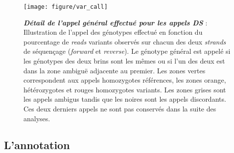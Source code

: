 \documentclass[12pt,a4paper,twoside]{ugathesis}
\theoremstyle{definition}
\theoremstyle{definition}
\theoremstyle{definition}
\theoremstyle{remark}
\begin{document}
\begin{figure}

{\centering \texttt{[image: figure/var\_call]} 

}

\caption[Détail de l'appel général effectué pour les appels DS]{\textbf{\emph{Détail de l'appel général effectué pour
les appels DS}} : Illustration de l'appel des génotypes effectué en
fonction du pourcentage de \emph{reads} variants observés sur chacun des
deux \emph{strands} de séquençage (\emph{forward} et \emph{reverse}). Le
génotype général est appelé si les génotypes des deux brins sont les
mêmes ou si l'un des deux est dans la zone ambiguë adjacente au premier.
Les zones vertes correspondent aux appels homozygotes références, les
zones orange, hétérozygotes et rouges homozygotes variants. Les zones
grises sont les appels ambigus tandis que les noires sont les appels
discordants. Ces deux derniers appels ne sont pas conservés dans la
suite des analyses.}\label{fig:picvarcall}
\end{figure}













\newpage

\subsection{L'annotation}\label{lannotation}
\end{document}
